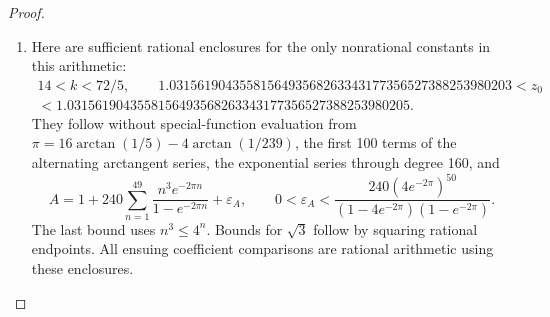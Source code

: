 \begin{proof}
\begin{enumerate}[label=\arabic*.,leftmargin=*]
\item Here are sufficient rational enclosures for the only nonrational
constants in this arithmetic:
\begin{equation}\label{ari:eq:cc-constants}
 \begin{gathered}
 14<k<72/5,\qquad
 1.0315619043558156493568263343177356527388253980203
 <z_0\\
 <1.0315619043558156493568263343177356527388253980205.
 \end{gathered}
\end{equation}
They follow without special-function evaluation from
$\pi=16\arctan(1/5)-4\arctan(1/239)$, the first 100 terms
of the alternating arctangent series, the exponential series
through degree 160, and
\[
 A=1+240\sum_{n=1}^{49}\frac{n^3e^{-2\pi n}}{1-e^{-2\pi n}}
       +\varepsilon_A,\qquad
 0<\varepsilon_A<
 \frac{240(4e^{-2\pi})^{50}}
 {(1-4e^{-2\pi})(1-e^{-2\pi})}.
\]
The last bound uses $n^3\le4^n$. Bounds for $\sqrt3$ follow
by squaring rational endpoints. All ensuing coefficient
comparisons are rational arithmetic using these enclosures.


\end{enumerate}
\end{proof}
